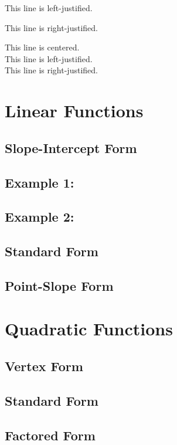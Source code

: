 \documentclass[12pt]{article}
\begin{document}
\begin{flushleft} This line is left-justified. \end{flushleft}

\begin{flushright} This line is right-justified. \end{flushright}

\Large
This line is centered.\\
This line is left-justified.\\
This line is right-justified.

\section{Linear Functions}
    \subsection{Slope-Intercept Form}
        \subsection{Example 1:}
        \subsection{Example 2:}
    \subsection{Standard Form}
    \subsection{Point-Slope Form}
\section{Quadratic Functions}
    \subsection{Vertex Form}
    \subsection{Standard Form}
    \subsection{Factored Form}
\end{document}
